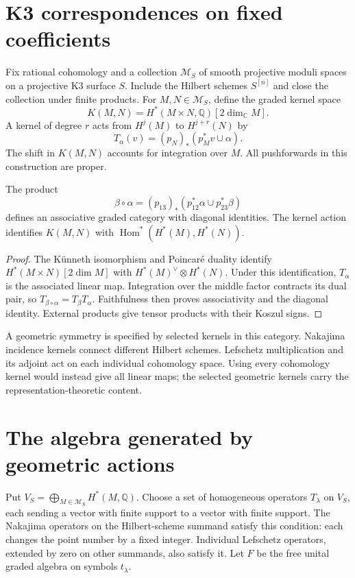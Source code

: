 \chapter{K3 correspondences on fixed coefficients}
Fix rational cohomology and a collection $\mathscr M_S$ of smooth
projective moduli spaces on a projective K3 surface $S$.
Include the Hilbert schemes $S^{[n]}$ and close the collection under
finite products.
For $M,N\in\mathscr M_S$, define the graded kernel space
\[
 K(M,N)=H^*(M\times N,\mathbb Q)[2\dim_{\mathbb C}M].
\]
A kernel of degree $r$ acts from $H^j(M)$ to $H^{j+r}(N)$ by
\[
 T_\alpha(v)=(p_N)_*(p_M^*v\cup\alpha).
\]
The shift in $K(M,N)$ accounts for integration over $M$.
All pushforwards in this construction are proper.

\begin{proposition}\label{cyiv:k3-kernels}
The product
\[
 \beta\circ\alpha=(p_{13})_*
 (p_{12}^*\alpha\cup p_{23}^*\beta)
\]
defines an associative graded category with diagonal identities.
The kernel action identifies $K(M,N)$ with
$\operatorname{Hom}^*(H^*(M),H^*(N))$.
\end{proposition}
\begin{proof}
The K\"unneth isomorphism and Poincar\'e duality identify
$H^*(M\times N)[2\dim M]$ with $H^*(M)^\vee\otimes H^*(N)$.
Under this identification, $T_\alpha$ is the associated linear map.
Integration over the middle factor contracts its dual pair, so
$T_{\beta\circ\alpha}=T_\beta T_\alpha$.
Faithfulness then proves associativity and the diagonal identity.
External products give tensor products with their Koszul signs.
\end{proof}

A geometric symmetry is specified by selected kernels in this category.
Nakajima incidence kernels connect different Hilbert schemes.
Lefschetz multiplication and its adjoint act on each individual
cohomology space.
Using every cohomology kernel would instead give all linear maps;
the selected geometric kernels carry the representation-theoretic content.

\chapter{The algebra generated by geometric actions}
Put $V_S=\bigoplus_{M\in\mathscr M_S}H^*(M,\mathbb Q)$.
Choose a set of homogeneous operators $T_\lambda$ on $V_S$, each sending
a vector with finite support to a vector with finite support.
The Nakajima operators on the Hilbert-scheme summand satisfy this
condition: each changes the point number by a fixed integer.
Individual Lefschetz operators, extended by zero on other summands,
also satisfy it.
Let $F$ be the free unital graded algebra on symbols $t_\lambda$.

